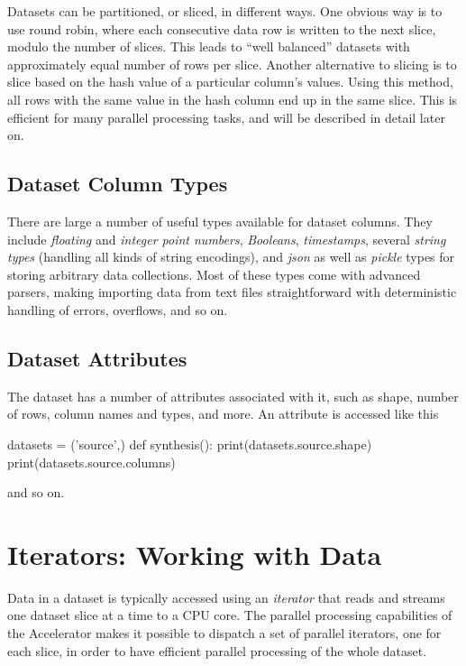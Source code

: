 Datasets can be partitioned, or sliced, in different ways.  One
obvious way is to use round robin, where each consecutive data row is
written to the next slice, modulo the number of slices.  This leads to
``well balanced'' datasets with approximately equal number of rows per
slice.  Another alternative to slicing is to slice based on the hash
value of a particular column's values.  Using this method, all rows
with the same value in the hash column end up in the same slice.  This
is efficient for many parallel processing tasks, and will be described
in detail later on.




\subsection{Dataset Column Types}

There are large a number of useful types available for dataset
columns.  They include \textsl{floating} and \textsl{integer point
  numbers}, \textsl{Booleans}, \textsl{timestamps}, several
\textsl{string types} (handling all kinds of string encodings), and
\textsl{json} as well as \textsl{pickle} types for storing arbitrary
data collections.  Most of these types come with advanced parsers,
making importing data from text files straightforward with
deterministic handling of errors, overflows, and so on.



\subsection{Dataset Attributes}
The dataset has a number of attributes associated with it, such as
shape, number of rows, column names and types, and more.
An attribute is accessed like this
\begin{python}
datasets = ('source',)
def synthesis():
    print(datasets.source.shape)
    print(datasets.source.columns)
\end{python}
and so on.



\section{Iterators: Working with Data}

Data in a dataset is typically accessed using an \emph{iterator} that
reads and streams one dataset slice at a time to a CPU core.  The
parallel processing capabilities of the Accelerator makes it possible
to dispatch a set of parallel iterators, one for each slice, in order
to have efficient parallel processing of the whole dataset.

